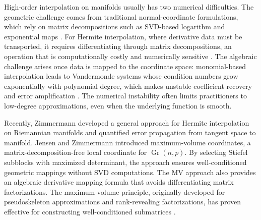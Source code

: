 \documentclass[11pt]{article}
\DeclareMathOperator{\Gr}{Gr}
\begin{document}
High-order interpolation on manifolds usually has two numerical difficulties. The geometric challenge comes from traditional normal-coordinate formulations, which rely on matrix decompositions such as SVD-based logarithm and exponential maps \cite{ciaramella2026grassmann,jacobsson2024approximating, doCarmo1992riemannian, lee2018introduction}. For Hermite interpolation, where derivative data must be transported, it requires differentiating through matrix decompositions, an operation that is computationally costly and numerically sensitive \cite{zimmermann2020hermite, zimmermann2017matrix, zimmermann2022computing}. The algebraic challenge arises once data is mapped to the coordinate space: monomial-based interpolation leads to Vandermonde systems whose condition numbers grow exponentially with polynomial degree, which makes unstable coefficient recovery and error amplification \cite{brubeck2021vandermonde, higham2002accuracy,trefethen2020}. The numerical instability often limits practitioners to low-degree approximations, even when the underlying function is smooth.

Recently, Zimmermann \cite{zimmermann2020hermite, zimmermann2024multivariate} developed a general approach for Hermite interpolation on Riemannian manifolds and quantified error propagation from tangent space to manifold. Jensen and Zimmermann \cite{jensen2024maximum} introduced maximum-volume coordinates, a matrix-decomposition-free local coordinate for $\Gr(n,p)$. By selecting Stiefel subblocks with maximized determinant, the approach ensures well-conditioned geometric mappings without SVD computations. The MV approach also provides an algebraic derivative mapping formula that avoids differentiating matrix factorizations. The maximum-volume principle, originally developed for pseudoskeleton approximations and rank-revealing factorizations, has proven effective for constructing well-conditioned submatrices \cite{goreinov1997theory, goreinov2010how}.
\end{document}
